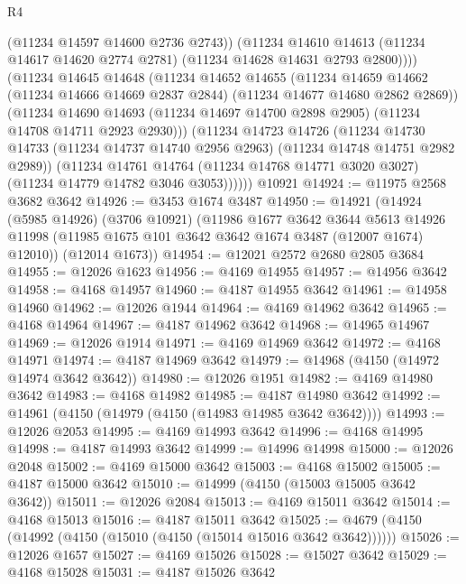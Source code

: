 \begin{lexlean}{R4}
\begin{coremodule}
              (@11234 @14597 @14600 @2736 @2743))
            (@11234
              @14610
              @14613
              (@11234 @14617 @14620 @2774 @2781)
              (@11234 @14628 @14631 @2793 @2800))))
        (@11234
          @14645
          @14648
          (@11234
            @14652
            @14655
            (@11234
              @14659
              @14662
              (@11234 @14666 @14669 @2837 @2844)
              (@11234 @14677 @14680 @2862 @2869))
            (@11234
              @14690
              @14693
              (@11234 @14697 @14700 @2898 @2905)
              (@11234 @14708 @14711 @2923 @2930)))
          (@11234
            @14723
            @14726
            (@11234
              @14730
              @14733
              (@11234 @14737 @14740 @2956 @2963)
              (@11234 @14748 @14751 @2982 @2989))
            (@11234
              @14761
              @14764
              (@11234 @14768 @14771 @3020 @3027)
              (@11234 @14779 @14782 @3046 @3053))))))
    @10921
@14924 := @11975 @2568 @3682 @3642
@14926 := @3453 @1674 @3487
@14950 := @14921
    (@14924
      (@5985 @14926)
      (@3706 @10921)
      (@11986
        @1677
        @3642
        @3644
        @5613
        @14926
        @11998
        (@11985 @1675 @101 @3642 @3642 @1674 @3487 (@12007 @1674) @12010))
      (@12014 @1673))
@14954 := @12021 @2572 @2680 @2805 @3684
@14955 := @12026 @1623
@14956 := @4169 @14955
@14957 := @14956 @3642
@14958 := @4168 @14957
@14960 := @4187 @14955 @3642
@14961 := @14958 @14960
@14962 := @12026 @1944
@14964 := @4169 @14962 @3642
@14965 := @4168 @14964
@14967 := @4187 @14962 @3642
@14968 := @14965 @14967
@14969 := @12026 @1914
@14971 := @4169 @14969 @3642
@14972 := @4168 @14971
@14974 := @4187 @14969 @3642
@14979 := @14968 (@4150 (@14972 @14974 @3642 @3642))
@14980 := @12026 @1951
@14982 := @4169 @14980 @3642
@14983 := @4168 @14982
@14985 := @4187 @14980 @3642
@14992 := @14961 (@4150 (@14979 (@4150 (@14983 @14985 @3642 @3642))))
@14993 := @12026 @2053
@14995 := @4169 @14993 @3642
@14996 := @4168 @14995
@14998 := @4187 @14993 @3642
@14999 := @14996 @14998
@15000 := @12026 @2048
@15002 := @4169 @15000 @3642
@15003 := @4168 @15002
@15005 := @4187 @15000 @3642
@15010 := @14999 (@4150 (@15003 @15005 @3642 @3642))
@15011 := @12026 @2084
@15013 := @4169 @15011 @3642
@15014 := @4168 @15013
@15016 := @4187 @15011 @3642
@15025 := @4679 (@4150 (@14992 (@4150 (@15010 (@4150 (@15014 @15016 @3642 @3642))))))
@15026 := @12026 @1657
@15027 := @4169 @15026
@15028 := @15027 @3642
@15029 := @4168 @15028
@15031 := @4187 @15026 @3642

\end{coremodule}
\end{lexlean}
